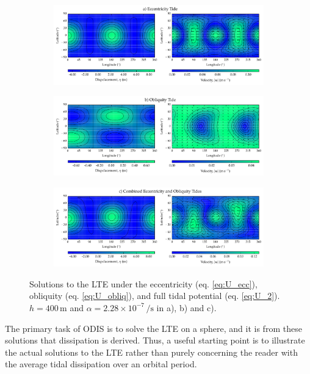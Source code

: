 \begin{figure}[!t]
\begin{subfigure}{\linewidth}
\centering
\includegraphics[width=0.8\linewidth,trim={0 0 0 0.2cm},clip]{Figures/Ecc_test}
\subcaption{\label{fig:LTE_a}}
\end{subfigure}\vspace*{-0.7cm}
\begin{subfigure}{\linewidth}
\centering
\includegraphics[width=0.8\linewidth]{Figures/Obliq_test}
\subcaption{\label{fig:LTE_b}}
\end{subfigure}\vspace*{-0.7cm}
\begin{subfigure}{\linewidth}
\centering
\includegraphics[width=0.8\linewidth]{Figures/Full_test}
\subcaption{\label{fig:LTE_c}}
\end{subfigure}\vspace*{-0.8cm}
\caption{Solutions to the LTE under the eccentricity (eq. \ref{eq:U_ecc}), obliquity (eq. \ref{eq:U_obliq}), and full tidal potential (eq. \ref{eq:U_2}). $h = 400 \, \si{\metre}$ and $\alpha = 2.28 \times 10^{-7} \, \si{\per\second}$ in a), b) and c).\label{fig:LTE_solns}}
\end{figure}

The primary task of ODIS is to solve the LTE on a sphere, and it is from these solutions that dissipation is derived. Thus, a useful starting point is to illustrate the actual solutions to the LTE rather than purely concerning the reader with the average tidal dissipation over an orbital period. 

